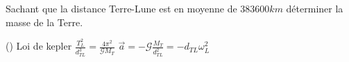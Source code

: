 \begin{Exercise}[title=Détermination de la masse de la Terre]
  Sachant que la distance Terre-Lune est en moyenne de $383600 km$ déterminer la
  masse de la Terre.
\end{Exercise}
\begin{Answer}
   ()
  \Question Loi de kepler $\frac{T_L^2}{d_{TL}^3}=\frac{4\pi^2}{\mathcal{G}M_T}$
  \Question $\vec{a}=-\mathcal{G}\frac{M_T}{d_{TL}^2}=-d_{TL}\omega_L^2$
\end{Answer}
